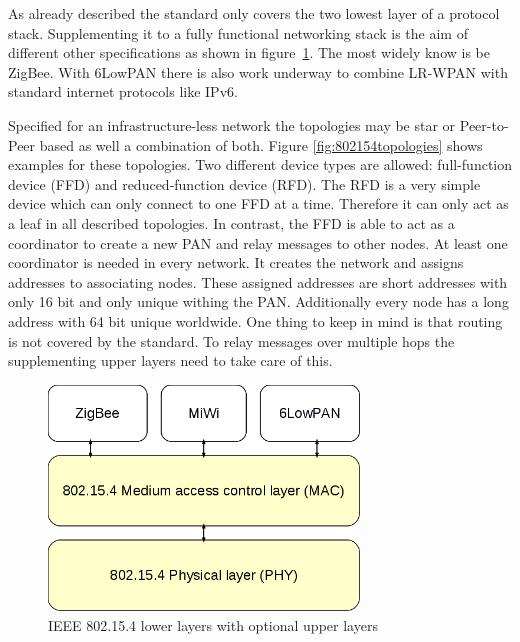 As already described the standard only covers the two lowest layer of a
protocol stack. Supplementing it to a fully functional networking stack is the aim
of different other specifications as shown in figure~\ref{fig:802154layer}. The
most widely know is be ZigBee. With 6LowPAN there is also work underway to combine
LR-WPAN with standard internet protocols like IPv6.

Specified for an infrastructure-less network the topologies may be star or
Peer-to-Peer based as well a combination of both. Figure \ref{fig:802154topologies}
shows examples for these topologies. Two different device types are allowed:
full-function device (FFD) and
reduced-function device (RFD). The RFD is a very simple device which can only
connect to one FFD at a time. Therefore it can only act as a leaf in all
described topologies. In contrast, the FFD is able to act as a coordinator to
create a new PAN and relay messages to other nodes. At least one coordinator
is needed in every network. It creates the network and assigns addresses to
associating nodes. These assigned addresses are short addresses with only 16 bit
and only unique withing the PAN. Additionally every node has a long address with
64 bit unique worldwide. One thing to keep in mind is that routing is not
covered by the standard. To relay messages over multiple hops the supplementing
upper layers need to take care of this.

\begin{figure}
  \begin{center}
    \includegraphics[height=6cm]{images/802154layer}
    \caption{IEEE 802.15.4 lower layers with optional upper layers}
        \label{fig:802154layer}
  \end{center}
\end{figure}

